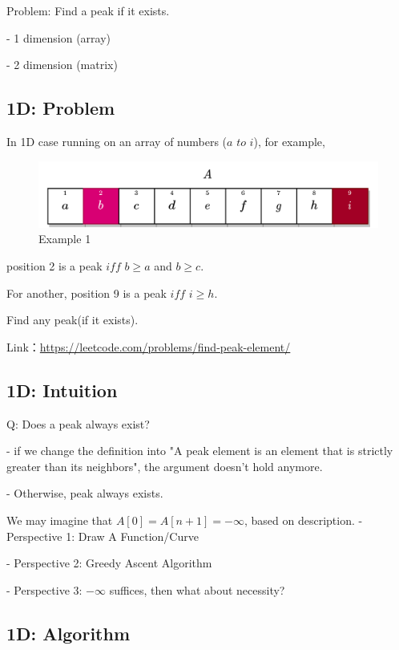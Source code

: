 \documentclass[12pt]{ctexart}
\begin{document}
Problem: Find a peak if it exists.

- 1 dimension (array)

- 2 dimension (matrix)

\subsection{1D: Problem}

In 1D case running on an array of numbers ($\textit{a to i}$), for example, 

\begin{figure}[htbp]
    \centering
    \includegraphics[width=0.75\linewidth]{assets/lec01-1d.png}
    \caption{Example 1}
\end{figure}

position 2 is a peak $\textit{iff}$ $b \ge a$ and $b \ge c$. 

For another, position 9 is a peak $\textit{iff}$ $i \ge h$. 

Find any peak(if it exists).

Link：\url{https://leetcode.com/problems/find-peak-element/}

\subsection{1D: Intuition}

Q: Does a peak always exist?

- if we change the definition into "A peak element is an element that is strictly greater than its neighbors", the argument doesn't hold anymore.

- Otherwise, peak always exists. \newline

We may imagine that $A[0] = A[n+1] = - \infty$, based on description.
- Perspective 1: Draw A Function/Curve

- Perspective 2: Greedy Ascent Algorithm

- Perspective 3: $-\infty$ suffices, then what about necessity?

\subsection{1D: Algorithm}
\end{document}
